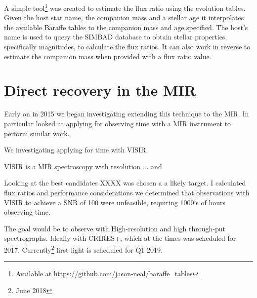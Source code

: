 A simple tool\footnote{Available at \url{https://github.com/jason-neal/baraffe_tables}} was created to estimate the flux ratio using the \citep{baraffe_evolutionary_2003,baraffe_new_2015} evolution tables. Given the host star name, the companion mass and a stellar age it interpolates the available Baraffe tables to the companion mass and age specified. The host's name is used to query the SIMBAD database to obtain stellar properties, specifically magnitudes, to calculate the flux ratios. It can also work in reverse to estimate the companion mass when provided with a flux ratio value.





\section{Direct recovery in the MIR}
Early on in 2015 we began investigating extending this technique to the MIR. In particular looked at applying for observing time with a MIR instrument to perform similar work.

We investigating applying for time with VISIR.

VISIR is a MIR spectroscopy with resolution ... and

Looking at the best candidates XXXX was chosen a a likely target. I calculated flux ratios and performance considerations we determined that observations with VISIR to achieve a SNR of 100 were unfeasible, requiring 1000's of hours observing time.

The goal would be to observe with High-resolution and high through-put spectrographs. Ideally with CRIRES+, which at the times was scheduled for 2017. Currently\footnote{June 2018} first light is scheduled for Q1 2019.




